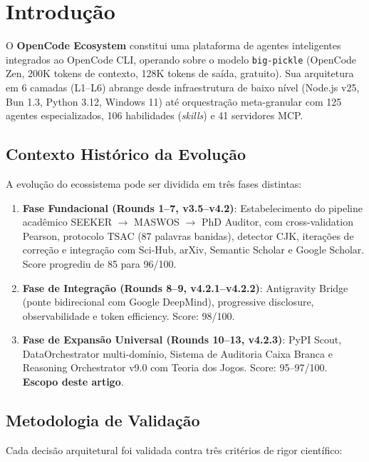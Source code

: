 \documentclass[12pt,a4paper]{article}
\begin{document}
\section{Introdução}

O \textbf{OpenCode Ecosystem} constitui uma plataforma de agentes inteligentes integrados ao OpenCode CLI, operando sobre o modelo \texttt{big-pickle} (OpenCode Zen, 200K tokens de contexto, 128K tokens de saída, gratuito). Sua arquitetura em 6 camadas (L1--L6) abrange desde infraestrutura de baixo nível (Node.js v25, Bun 1.3, Python 3.12, Windows 11) até orquestração meta-granular com 125 agentes especializados, 106 habilidades (\textit{skills}) e 41 servidores MCP.

\subsection{Contexto Histórico da Evolução}

A evolução do ecossistema pode ser dividida em três fases distintas:

\begin{enumerate}[itemsep=2pt]
  \item \textbf{Fase Fundacional (Rounds 1--7, v3.5--v4.2)}: Estabelecimento do pipeline acadêmico SEEKER $\rightarrow$ MASWOS $\rightarrow$ PhD Auditor, com cross-validation Pearson, protocolo TSAC (87 palavras banidas), detector CJK, iterações de correção e integração com Sci-Hub, arXiv, Semantic Scholar e Google Scholar. Score progrediu de 85 para 96/100.
  \item \textbf{Fase de Integração (Rounds 8--9, v4.2.1--v4.2.2)}: Antigravity Bridge (ponte bidirecional com Google DeepMind), progressive disclosure, observabilidade e token efficiency. Score: 98/100.
  \item \textbf{Fase de Expansão Universal (Rounds 10--13, v4.2.3)}: PyPI Scout, DataOrchestrator multi-domínio, Sistema de Auditoria Caixa Branca e Reasoning Orchestrator v9.0 com Teoria dos Jogos. Score: 95--97/100. \textbf{Escopo deste artigo}.
\end{enumerate}

\subsection{Metodologia de Validação}

Cada decisão arquitetural foi validada contra três critérios de rigor científico:
\end{document}
